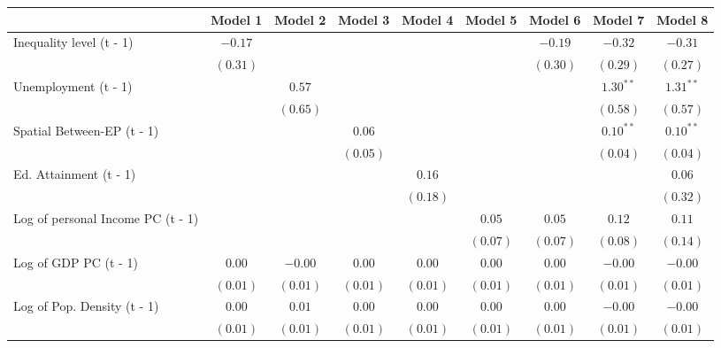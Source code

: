 
\begin{table}
\begin{center}
\begin{tabular}{l c c c c c c c c}
\hline
 & Model 1 & Model 2 & Model 3 & Model 4 & Model 5 & Model 6 & Model 7 & Model 8 \\
\hline
Inequality level (t - 1)          & $-0.17$  &          &          &          &          & $-0.19$  & $-0.32$     & $-0.31$     \\
                                  & $(0.31)$ &          &          &          &          & $(0.30)$ & $(0.29)$    & $(0.27)$    \\
Unemployment (t - 1)              &          & $0.57$   &          &          &          &          & $1.30^{**}$ & $1.31^{**}$ \\
                                  &          & $(0.65)$ &          &          &          &          & $(0.58)$    & $(0.57)$    \\
Spatial Between-EP (t - 1)        &          &          & $0.06$   &          &          &          & $0.10^{**}$ & $0.10^{**}$ \\
                                  &          &          & $(0.05)$ &          &          &          & $(0.04)$    & $(0.04)$    \\
Ed. Attainment (t - 1)            &          &          &          & $0.16$   &          &          &             & $0.06$      \\
                                  &          &          &          & $(0.18)$ &          &          &             & $(0.32)$    \\
Log of personal Income PC (t - 1) &          &          &          &          & $0.05$   & $0.05$   & $0.12$      & $0.11$      \\
                                  &          &          &          &          & $(0.07)$ & $(0.07)$ & $(0.08)$    & $(0.14)$    \\
Log of GDP PC (t - 1)             & $0.00$   & $-0.00$  & $0.00$   & $0.00$   & $0.00$   & $0.00$   & $-0.00$     & $-0.00$     \\
                                  & $(0.01)$ & $(0.01)$ & $(0.01)$ & $(0.01)$ & $(0.01)$ & $(0.01)$ & $(0.01)$    & $(0.01)$    \\
Log of Pop. Density (t - 1)       & $0.00$   & $0.01$   & $0.00$   & $0.00$   & $0.00$   & $0.00$   & $-0.00$     & $-0.00$     \\
                                  & $(0.01)$ & $(0.01)$ & $(0.01)$ & $(0.01)$ & $(0.01)$ & $(0.01)$ & $(0.01)$    & $(0.01)$    \\

\end{tabular}
\end{center}
\end{table}
